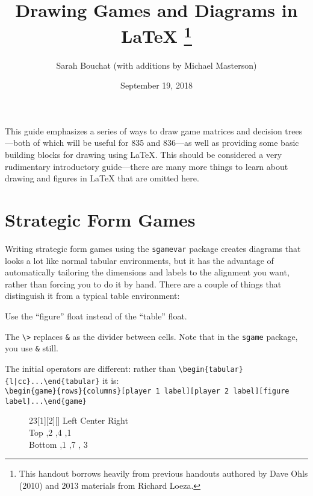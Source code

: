 \documentclass[12pt]{article}
\title{Drawing Games and Diagrams in {\LaTeX} \footnote{This handout borrows heavily from previous handouts authored by Dave Ohls (2010) and 2013 materials from Richard Loeza.}}
\author{Sarah Bouchat (with additions by Michael Masterson)}
\date{September 19, 2018}
\begin{document}
\maketitle

This guide emphasizes a series of ways to draw game matrices and decision trees---both of which will be useful for 835 and 836---as well as providing some basic building blocks for drawing using {\LaTeX}. This should be considered a very rudimentary introductory guide---there are many more things to learn about drawing and figures in {\LaTeX} that are omitted here.\\


\section{Strategic Form Games}

Writing strategic form games using the \verb+sgamevar+ package creates diagrams that looks a lot like normal tabular environments, but it has the advantage of automatically tailoring the dimensions and labels to the alignment you want, rather than forcing you to do it by hand. There are a couple of things that distinguish it from a typical table environment:

\begin{compactitem}
\item Use the ``figure'' float instead of the ``table'' float.
\item The \verb+\>+ replaces \verb+&+ as the divider between cells. Note that in the \verb+sgame+ package, you use \verb+&+ still. 
\item The initial operators are different: rather than \verb+\begin{tabular}{l|cc}...\end{tabular}+ it is: \\ 
\small 
\verb+\begin{game}{rows}{columns}[player 1 label][player 2 label][figure label]...\end{game}+ \\
\end{compactitem}

\begin{figure}[h!]
\begin{center}
\begin{footnotesize}
\begin{game}{2}{3}[1][2][]
        \> Left \> Center \> Right   \\
Top      ,2  ,4    ,1   \\
Bottom    ,1  ,7    , 3 \\
\end{game}
\end{footnotesize}
\end{center}
\end{figure}
\end{document}
